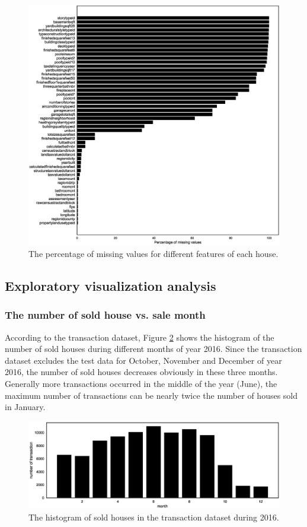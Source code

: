 \documentclass[12pt]{article}
\begin{document}
\begin{figure}[!ht]
	\centering
	\includegraphics[width=1\linewidth]{pic/missing-value}
	\caption{The percentage of missing values for different features of each house.}
	\label{fig:missing-values}
\end{figure}

\subsection{Exploratory visualization analysis}
\subsubsection{The number of sold house vs. sale month}
According to the transaction dataset, Figure \ref{fig:num-sold-vs-month} shows the histogram of the number of sold houses during different months of year 2016. Since the transaction dataset excludes the test data for October, November and December of year 2016, the number of sold houses decreases obviously in these three months. Generally more transactions occurred in the middle of the year (June), the maximum number of transactions can be nearly twice the number of houses sold in January.
\begin{figure}[!ht]
	\centering
	\includegraphics[width=1\linewidth]{pic/num-sold-vs-month}
	\caption{The histogram of sold houses in the transaction dataset during 2016.}
	\label{fig:num-sold-vs-month}
\end{figure}
\end{document}

